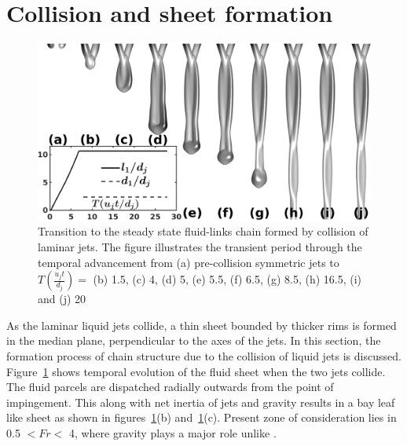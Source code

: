 \documentclass{jfm}
\begin{document}
\section{Collision and sheet formation}
\begin{figure}
	\centering
	\includegraphics[width=0.6\linewidth]{Figure3}
	\caption{Transition to the steady state fluid-links chain formed by collision of laminar jets. The figure illustrates the transient period through the temporal advancement from (a) pre-collision symmetric jets to $T (\frac{u_jt}{d_j}) = $ (b) 1.5, (c) 4, (d) 5, (e) 5.5, (f) 6.5, (g) 8.5, (h) 16.5, (i) and (j) 20}
	\label{Figure::transient}\vspace{-3.2mm}
\end{figure}
As the laminar liquid jets collide, a thin sheet bounded by thicker rims is formed in the median plane, perpendicular to the axes of the jets. In this section, the formation process of chain structure due to the collision of liquid jets is discussed. Figure~\ref{Figure::transient} shows temporal evolution of the fluid sheet when the two jets collide. The fluid parcels are dispatched radially outwards from the point of impingement. This along with net inertia of jets and gravity results in a bay leaf like sheet as shown in figures~\ref{Figure::transient}(b) and~\ref{Figure::transient}(c). Present zone of consideration lies in 0.5 $< Fr <$ 4, where gravity plays a major role unlike \cite{bush2004collision,bremond2006atomization}.
\end{document}
